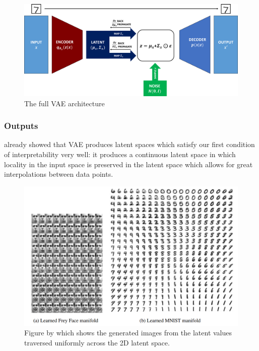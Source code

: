                 \begin{figure}[H] \label{fig:vae_arch2}
                    \centering
                    \includegraphics[width=1\textwidth]{imgs/vae_arch2.png}
                    \caption{The full VAE architecture}
                \end{figure}
                
            \subsubsection{Outputs}
                \cite{kingma2013auto} already showed that VAE produces latent spaces which satisfy our first condition of interpretability very well: it produces a continuous latent space in which locality in the input space is preserved in the latent space which allows for great interpolations between data points.
                
                \begin{figure}[H] \label{fig:vae_freyface_mnist}
                    \centering
                    \includegraphics[width=1\textwidth]{imgs/vae_freyface_mnist.png}
                    \caption{Figure by \cite{kingma2013auto} which shows the generated images from the latent values traversed uniformly across the 2D latent space.}
                \end{figure}

